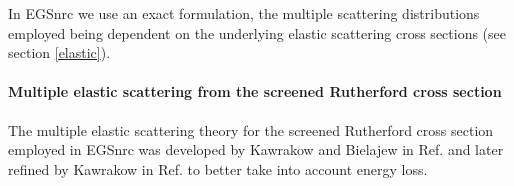 In EGSnrc we use an exact formulation, the multiple scattering 
distributions employed being dependent on the underlying 
elastic scattering cross sections (see section \ref{elastic}).

\paragraph{Multiple elastic scattering from the screened Rutherford 
cross section} \hfill

The multiple elastic scattering theory for the screened 
Rutherford cross section employed in EGSnrc was developed 
by Kawrakow and Bielajew in Ref. \cite{KB97} and later refined 
by Kawrakow in Ref. \cite{Ka99a} to better take into account 
energy loss. 

